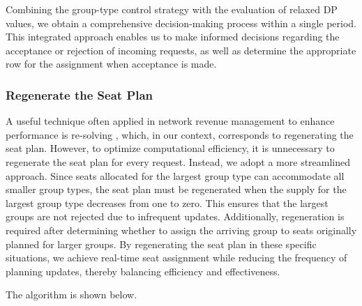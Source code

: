 
Combining the group-type control strategy with the evaluation of relaxed DP values, we obtain a comprehensive decision-making process within a single period. This integrated approach enables us to make informed decisions regarding the acceptance or rejection of incoming requests, as well as determine the appropriate row for the assignment when acceptance is made. 

\subsubsection{Regenerate the Seat Plan}
A useful technique often applied in network revenue management to enhance performance is re-solving \citep{secomandi2008analysis, jasin2012re}, which, in our context, corresponds to regenerating the seat plan. However, to optimize computational efficiency, it is unnecessary to regenerate the seat plan for every request. Instead, we adopt a more streamlined approach. Since seats allocated for the largest group type can accommodate all smaller group types, the seat plan must be regenerated when the supply for the largest group type decreases from one to zero. This ensures that the largest groups are not rejected due to infrequent updates. Additionally, regeneration is required after determining whether to assign the arriving group to seats originally planned for larger groups. By regenerating the seat plan in these specific situations, we achieve real-time seat assignment while reducing the frequency of planning updates, thereby balancing efficiency and effectiveness.

The algorithm is shown below.

